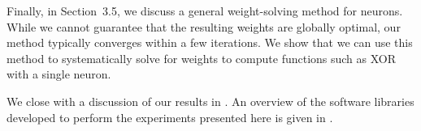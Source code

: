 Finally, in Section~3.5, we discuss a general weight-solving method for \nlif neurons.
While we cannot guarantee that the resulting weights are globally optimal, our method typically converges within a few iterations.
We show that we can use this method to systematically solve for weights to compute functions such as XOR with a single neuron.

We close with a discussion of our results in .
An overview of the software libraries developed to perform the experiments presented here is given in .
